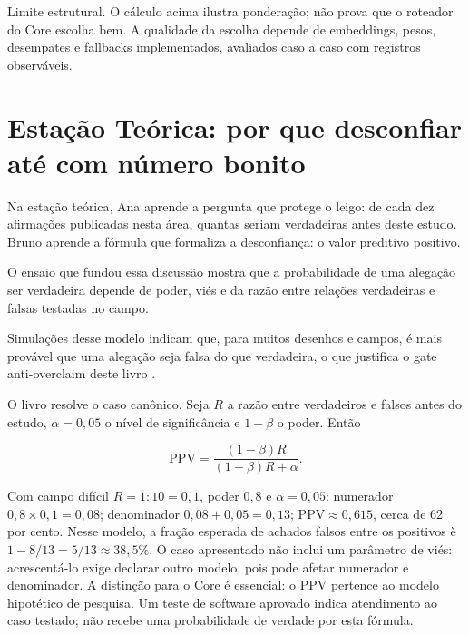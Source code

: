 \begin{aviso}
Limite estrutural. O c\'alculo acima ilustra pondera\c{c}\~ao; n\~ao prova que o roteador do Core escolha bem. A qualidade da escolha depende de embeddings, pesos, desempates e fallbacks implementados, avaliados caso a caso com registros observ\'aveis.
\end{aviso}

\section{Esta\c{c}\~ao Te\'orica: por que desconfiar at\'e com n\'umero bonito}

Na esta\c{c}\~ao te\'orica, Ana aprende a pergunta que protege o leigo: de cada dez afirma\c{c}\~oes publicadas nesta \'area, quantas seriam verdadeiras antes deste estudo. Bruno aprende a f\'ormula que formaliza a desconfian\c{c}a: o valor preditivo positivo.

O ensaio que fundou essa discuss\~ao mostra que a probabilidade de uma alega\c{c}\~ao ser verdadeira depende de poder, vi\'es e da raz\~ao entre rela\c{c}\~oes verdadeiras e falsas testadas no campo.

Simula\c{c}\~oes desse modelo indicam que, para muitos desenhos e campos, \'e mais prov\'avel que uma alega\c{c}\~ao seja falsa do que verdadeira, o que justifica o gate anti-overclaim deste livro .

O livro resolve o caso can\^onico. Seja $R$ a raz\~ao entre verdadeiros e falsos antes do estudo, $\alpha=0{,}05$ o n\'ivel de signific\^ancia e $1-\beta$ o poder. Ent\~ao

\[ \mathrm{PPV} = \frac{(1-\beta)R}{(1-\beta)R + \alpha}. \]

Com campo dif\'icil $R=1{:}10=0{,}1$, poder $0{,}8$ e $\alpha=0{,}05$: numerador $0{,}8 \times 0{,}1 = 0{,}08$; denominador $0{,}08+0{,}05=0{,}13$; $\mathrm{PPV} \approx 0{,}615$, cerca de 62 por cento. Nesse modelo, a fra\c{c}\~ao esperada de achados falsos entre os positivos \`e $1-8/13=5/13\approx38{,}5\%$. O caso apresentado n\~ao inclui um par\^ametro de vi\'es: acrescent\'a-lo exige declarar outro modelo, pois pode afetar numerador e denominador. A distin\c{c}\~ao para o Core \'e essencial: o PPV pertence ao modelo hipot\'etico de pesquisa. Um teste de software aprovado indica atendimento ao caso testado; n\~ao recebe uma probabilidade de verdade por esta f\'ormula.


